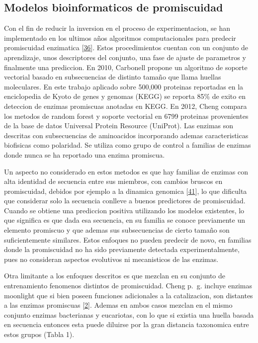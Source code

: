 \documentclass[12pt,twoside]{reedthesis}
\begin{document}
  \subsection{Modelos bioinformaticos de
  promiscuidad}\label{modelos-bioinformaticos-de-promiscuidad}
  
  Con el fin de reducir la inversion en el proceso de experimentacion, se
  han implementado en los ultimos años algoritmos computacionales para
  predecir promiscuidad enzimatica
  {[}\protect\hyperlink{ref-carbonell_molecular_2010}{36}{]}. Estos
  procedimientos cuentan con un conjunto de aprendizaje, unos descriptores
  del conjunto, una fase de ajuste de parametros y finalmente una
  prediccion. En 2010, Carbonell propone un algoritmo de soporte vectorial
  basado en subsecuencias de distinto tamaño que llama huellas
  moleculares. En este trabajo aplicado sobre 500,000 proteinas reportadas
  en la enciclopedia de Kyoto de genes y genomas (KEGG) se reporta 85\% de
  exito en deteccion de enzimas promiscuas anotadas en KEGG. En 2012,
  Cheng compara los metodos de random forest y soporte vectorial en 6799
  proteinas provenientes de la base de datos Universal Protein Resource
  (UniProt). Las enzimas son descritas con subsecuencias de aminoacidos
  incorporando ademas caracteristicas biofisicas como polaridad. Se
  utiliza como grupo de control a familias de enzimas donde nunca se ha
  reportado una enzima promiscua.
  
  Un aspecto no considerado en estos metodos es que hay familias de
  enzimas con alta identidad de secuencia entre sus miembros, con cambios
  bruscos en promiscuidad, debidos por ejemplo a la dinamica genomica
  {[}\protect\hyperlink{ref-noda-garcia_evolution_2013}{41}{]}, lo que
  dificulta que considerar solo la secuencia conlleve a buenos predictores
  de promiscuidad. Cuando se obtiene una prediccion positiva utilizando
  los modelos existentes, lo que significa es que dada esa secuencia, en
  su familia se conoce previamente un elemento promiscuo y que ademas sus
  subsecuencias de cierto tamaño son suficientemente similares. Estos
  enfoques no pueden predecir de novo, en familias donde la promiscuidad
  no ha sido previamente detectada experimentalmente, pues no consideran
  aspectos evolutivos ni mecanisticos de las enzimas.
  
  Otra limitante a los enfoques descritos es que mezclan en su conjunto de
  entrenamiento fenomenos distintos de promiscuidad. Cheng p.~g. incluye
  enzimas moonlight que si bien poseen funciones adicionales a la
  catalizacion, son distantes a las enzimas promiscuas
  {[}\protect\hyperlink{ref-copley_enzymes_2003}{2}{]}. Ademas en ambos
  casos mezclan en el mismo conjunto enzimas bacterianas y eucariotas, con
  lo que si existia una huella basada en secuencia entonces esta puede
  diluirse por la gran distancia taxonomica entre estos grupos (Tabla 1).
  
\end{document}
